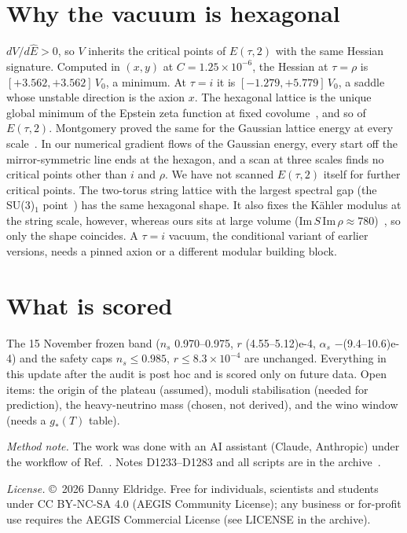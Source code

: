 \documentclass[aps,prd,twocolumn,superscriptaddress,nofootinbib,showkeys]{revtex4-2}
\begin{document}
\section{Why the vacuum is hexagonal}
$dV/d\hat E>0$, so $V$ inherits the critical points of $E(\tau,2)$ with the same Hessian signature. Computed in $(x,y)$ at $C=1.25\times10^{-6}$, the Hessian at $\tau=\rho$ is $[+3.562,+3.562]\,V_0$, a minimum. At $\tau=i$ it is $[-1.279,+5.779]\,V_0$, a saddle whose unstable direction is the axion $x$. The hexagonal lattice is the unique global minimum of the Epstein zeta function at fixed covolume~\cite{Rankin,Cassels}, and so of $E(\tau,2)$. Montgomery proved the same for the Gaussian lattice energy at every scale~\cite{Mont}. In our numerical gradient flows of the Gaussian energy, every start off the mirror-symmetric line ends at the hexagon, and a scan at three scales finds no critical points other than $i$ and $\rho$. We have not scanned $E(\tau,2)$ itself for further critical points. The two-torus string lattice with the largest spectral gap (the SU(3)$_1$ point~\cite{ACD}) has the same hexagonal shape. It also fixes the K\"ahler modulus at the string scale, however, whereas ours sits at large volume ($\mathrm{Im}\,S\,\mathrm{Im}\,\rho\approx780$)~\cite{P6}, so only the shape coincides. A $\tau=i$ vacuum, the conditional variant of earlier versions, needs a pinned axion or a different modular building block.

\section{What is scored}
The 15 November frozen band ($n_s$ 0.970--0.975, $r$ (4.55--5.12)e-4, $\alpha_s$ $-$(9.4--10.6)e-4) and the safety caps $n_s\le0.985$, $r\le8.3\times10^{-4}$ are unchanged. Everything in this update after the audit is post hoc and is scored only on future data. Open items: the origin of the plateau (assumed), moduli stabilisation (needed for prediction), the heavy-neutrino mass (chosen, not derived), and the wino window (needs a $g_*(T)$ table).

\emph{Method note.} The work was done with an AI assistant (Claude, Anthropic) under the workflow of Ref.~\cite{P4}. Notes D1233--D1283 and all scripts are in the archive~\cite{AEGIS}.

\emph{License.} \copyright~2026 Danny Eldridge. Free for individuals, scientists and students under CC BY-NC-SA 4.0 (AEGIS Community License); any business or for-profit use requires the AEGIS Commercial License (see LICENSE in the archive).
\end{document}
